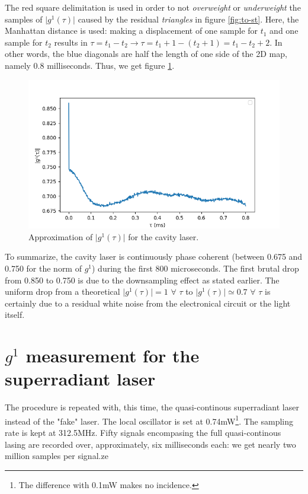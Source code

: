 \documentclass[10pt]{report}
\begin{document}
The red square delimitation is used in order to not \textit{overweight} or \textit{underweight} the samples of $\vert g^1(\tau) \vert$ caused by the residual \textit{triangles} in figure \ref{fig:to-st}. Here, the Manhattan distance is used: making a displacement of one sample for $t_1$ and one sample for $t_2$ results in $\tau = t_1 - t_2 \rightarrow \tau = t_1 + 1 - (t_2 + 1) = t_1 - t_2 + 2$. In other words, the blue diagonals are half the length of one side of the 2D map, namely 0.8 milliseconds. Thus, we get figure \ref{fig:st-stat}.
\begin{figure}[h!]
\centering
\includegraphics[width=0.7\linewidth]{st-stat}
\caption{Approximation of $\vert g^1(\tau) \vert$ for the cavity laser.}
\label{fig:st-stat}
\end{figure}

To summarize, the cavity laser is continuously phase coherent (between 0.675 and 0.750 for the norm of $g^1$) during the first 800 microseconds. The first brutal drop from 0.850 to 0.750 is due to the downsampling effect as stated earlier. The uniform drop from a theoretical $\vert g^1(\tau) \vert = 1 \,\, \forall \,\, \tau $ to $\vert g^1(\tau) \vert \simeq 0.7 \,\, \forall \,\, \tau $ is certainly due to a residual white noise from the electronical circuit or the light itself.

\section{$g^1$ measurement for the superradiant laser}

The procedure is repeated with, this time, the quasi-continous superradiant laser instead of the "fake" laser. The local oscillator is set at 0.74mW\footnote{The difference with 0.1mW makes no incidence.}. The sampling rate is kept at 312.5MHz. Fifty signals encompasing the full quasi-continous lasing are recorded over, approximately, six milliseconds each: we get nearly two million samples per signal.ze
\end{document}

